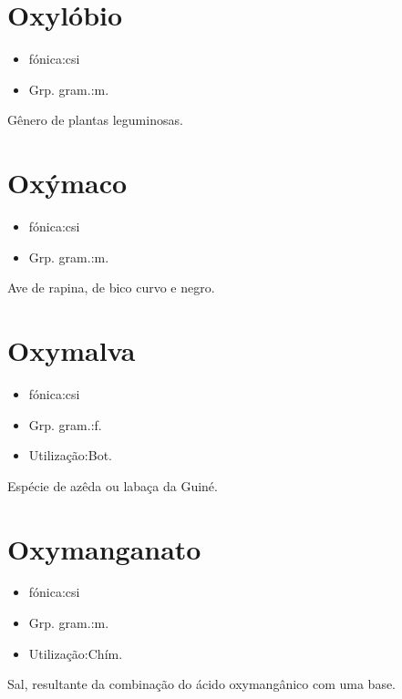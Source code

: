 \section{Oxylóbio}
\begin{itemize}
\item {fónica:csi}
\end{itemize}
\begin{itemize}
\item {Grp. gram.:m.}
\end{itemize}
Gênero de plantas leguminosas.
\section{Oxýmaco}
\begin{itemize}
\item {fónica:csi}
\end{itemize}
\begin{itemize}
\item {Grp. gram.:m.}
\end{itemize}
Ave de rapina, de bico curvo e negro.
\section{Oxymalva}
\begin{itemize}
\item {fónica:csi}
\end{itemize}
\begin{itemize}
\item {Grp. gram.:f.}
\end{itemize}
\begin{itemize}
\item {Utilização:Bot.}
\end{itemize}
Espécie de azêda ou labaça da Guiné.
\section{Oxymanganato}
\begin{itemize}
\item {fónica:csi}
\end{itemize}
\begin{itemize}
\item {Grp. gram.:m.}
\end{itemize}
\begin{itemize}
\item {Utilização:Chím.}
\end{itemize}
Sal, resultante da combinação do ácido oxymangânico com uma base.
